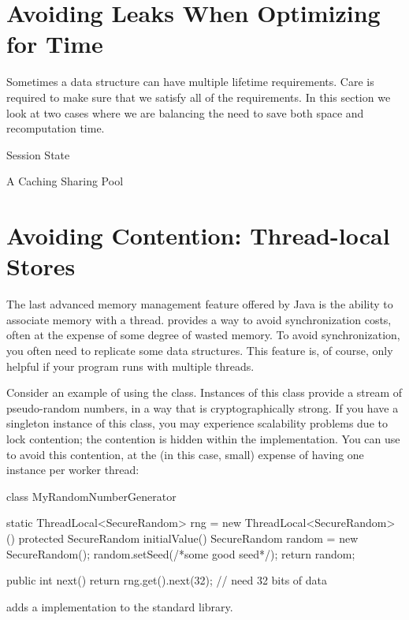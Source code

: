 \section{Avoiding Leaks When Optimizing for Time}
Sometimes a data structure can have multiple lifetime requirements. 
Care is required to make sure that we satisfy all of the requirements.  In this
section we look at two cases where we are balancing the need to save both space and recomputation
time.

\begin{example}{Session State}
\end{example}

\begin{example}{A Caching Sharing Pool}
\end{example}

\section{Avoiding Contention: Thread-local Stores}

The last advanced memory management feature offered by Java is the ability to
associate memory with a thread. \Tls provides a way to avoid
synchronization costs, often at the expense of some degree of wasted memory. To
avoid synchronization, you often need to replicate some data structures. This
feature is, of course, only helpful if your program runs with multiple threads.

Consider an example of using the  class. Instances of this
class provide a stream of pseudo-random numbers, in a way that is
cryptographically strong. If you have a singleton instance of this class, you may
experience scalability problems due to lock contention; the contention is hidden
within the  implementation. You can use \tls
to avoid this contention, at the (in this case, small) expense of having one
instance per worker thread:
\begin{shortlisting}
class MyRandomNumberGenerator {
   static ThreadLocal<SecureRandom> rng = new ThreadLocal<SecureRandom>() {
      protected SecureRandom initialValue() {
         SecureRandom random = new SecureRandom();
         random.setSeed(/*some good seed*/);
         return random;
      }
   }
   
   public int next() {
      return rng.get().next(32); // need 32 bits of data
   }
}
\end{shortlisting} 
\javaseven adds a  implementation to the standard
library.

